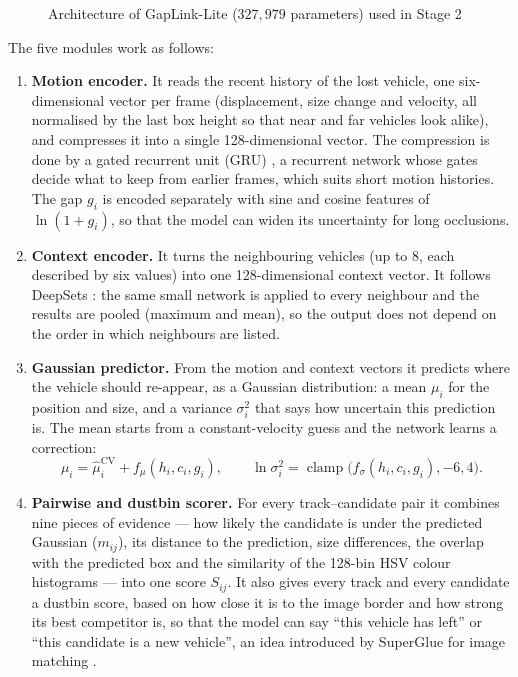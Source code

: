 \begin{figure}[H]
{%
    }
    \caption{Architecture of GapLink-Lite ($327{,}979$ parameters) used in Stage 2}
    \label{fig:model_arch}
\end{figure}

The five modules work as follows:
\begin{enumerate}
    \item \textbf{Motion encoder.} It reads the recent history of the lost vehicle, one six-dimensional vector per frame (displacement, size change and velocity, all normalised by the last box height so that near and far vehicles look alike), and compresses it into a single 128-dimensional vector. The compression is done by a gated recurrent unit (GRU) \cite{cho2014gru}, a recurrent network whose gates decide what to keep from earlier frames, which suits short motion histories. The gap $g_i$ is encoded separately with sine and cosine features of $\ln(1+g_i)$, so that the model can widen its uncertainty for long occlusions.
    \item \textbf{Context encoder.} It turns the neighbouring vehicles (up to $8$, each described by six values) into one 128-dimensional context vector. It follows DeepSets \cite{zaheer2017deepsets}: the same small network is applied to every neighbour and the results are pooled (maximum and mean), so the output does not depend on the order in which neighbours are listed.
    \item \textbf{Gaussian predictor.} From the motion and context vectors it predicts where the vehicle should re-appear, as a Gaussian distribution: a mean $\mu_i$ for the position and size, and a variance $\sigma_i^2$ that says how uncertain this prediction is. The mean starts from a constant-velocity guess and the network learns a correction:
    \begin{equation}
        \mu_i = \hat{\mu}^{\text{CV}}_i + f_{\mu}(h_i, c_i, g_i), \qquad \ln \sigma_i^2 = \operatorname{clamp}\big(f_{\sigma}(h_i, c_i, g_i), -6, 4\big).
    \end{equation}
    \item \textbf{Pairwise and dustbin scorer.} For every track--candidate pair it combines nine pieces of evidence --- how likely the candidate is under the predicted Gaussian ($m_{ij}$), its distance to the prediction, size differences, the overlap with the predicted box and the similarity of the 128-bin HSV colour histograms --- into one score $S_{ij}$. It also gives every track and every candidate a dustbin score, based on how close it is to the image border and how strong its best competitor is, so that the model can say ``this vehicle has left'' or ``this candidate is a new vehicle'', an idea introduced by SuperGlue for image matching \cite{sarlin2020superglue}.

\end{enumerate}
